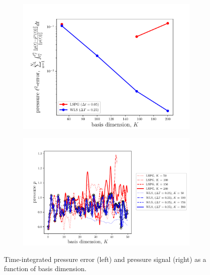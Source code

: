 \begin{figure}
\begin{center}
\begin{subfigure}[t]{0.45\textwidth}
\includegraphics[trim={0cm 0cm 0cm 0cm},clip,width=1.\linewidth]{figs/cavity_new/perror_vs_basisSize.pdf}
\end{subfigure}
\begin{subfigure}[t]{0.54\textwidth}
\includegraphics[trim={0cm 0cm 0cm 0cm},clip,width=1.\linewidth]{figs/cavity_new/p_vs_basisSize.pdf}
\end{subfigure}
\end{center}
\caption{Time-integrated pressure error (left) and pressure signal (right) as a function of basis dimension.}
\label{fig:cav_results_pressure}
\end{figure}





